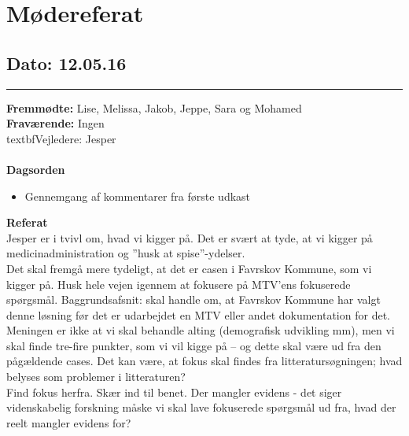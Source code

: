 \chapter{Mødereferat}

\section{Dato: 12.05.16}
\hrule

\textbf{Fremmødte:} Lise, Melissa, Jakob, Jeppe, Sara og Mohamed \\
\textbf{Fraværende:} Ingen
\\textbf{Vejledere:} Jesper
\\
\\
\textbf{Dagsorden}
\begin{itemize}
	\item Gennemgang af kommentarer fra første udkast \\ 
\end{itemize}


\textbf{Referat} 
\\
Jesper er i tvivl om, hvad vi kigger på. Det er svært at tyde, at vi kigger på medicinadministration og ”husk at spise”-ydelser. \\
Det skal fremgå mere tydeligt, at det er casen i Favrskov Kommune, som vi kigger på. Husk hele vejen igennem at fokusere på MTV’ens fokuserede spørgsmål. 
Baggrundsafsnit: skal handle om, at Favrskov Kommune har valgt denne løsning før det er udarbejdet en MTV eller andet dokumentation for det. Meningen er ikke at vi skal behandle alting (demografisk udvikling mm), men vi skal finde tre-fire punkter, som vi vil kigge på – og dette skal være ud fra den pågældende cases. Det kan være, at fokus skal findes fra litteratursøgningen; hvad belyses som problemer i litteraturen? \\ Find fokus herfra. 
Skær ind til benet. 
Der mangler evidens - det siger videnskabelig forskning måske vi skal lave fokuserede spørgsmål ud fra, hvad der reelt mangler evidens for? \\


